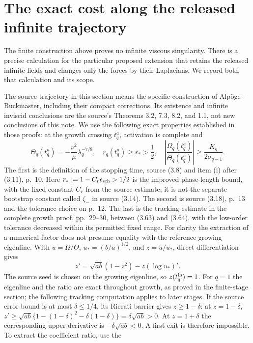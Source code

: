 \section{The exact cost along the released infinite trajectory}
\label{sec:infinitecost}
The finite construction above proves no infinite viscous singularity.
There is a precise calculation for the particular proposed extension
that retains the released infinite fields and changes only the forces
by their Laplacians. We record both that calculation and its scope.

The source trajectory in this section means the specific construction
of Alp\"oge--Buckmaster, including their compact corrections. Its
existence and infinite inviscid conclusions are the source's
Theorems 3.2, 7.3, 8.2, and 1.1, not new conclusions of this note.
We use the following exact properties established in those proofs:
at the growth crossing $t_q^a$, activation is complete and
\begin{equation}
 \Theta_q(t_q^a)=-\frac{\nu^2}{\mu}\lambda_q^{-7/8},
 \quad r_q(t_q^a)\geq r_*>\frac12,
 \quad \left|\frac{\Omega_q(t_q^a)}{\Theta_q(t_q^a)}\right|
 \geq\frac{K_q}{2\sigma_{q-1}}.
 \label{eq:sourcecrossingbounds}
\end{equation}
The first is the definition of the stopping time, source (3.8)
and item (i) after (3.11), p.~10. Here $r_*:=1-C_r\epsilon_{\rm sch}>1/2$ is the improved phase-length bound, with the fixed constant $C_r$ from the source estimate; it is not the separate bootstrap constant called $\zeta_-$ in source (3.14). The second is source (3.18),
p.~13 and the tolerance choice on p.~12. The last is the
tracking estimate in the complete growth proof, pp.~29--30,
between (3.63) and (3.64), with the low-order tolerance decreased
within its permitted fixed range. For clarity the extraction of
a numerical factor does not presume equality with the reference
growing eigenline. With $u=\Omega/\Theta$, $u_*=(b/a)^{1/2}$,
and $z=u/u_*$, direct differentiation gives
\[
 z'=\sqrt{ab}(1-z^2)-z(\log u_*)'.
\]
The source seed is chosen on the growing eigenline, so
$z(t_q^{\rm in})=1$. For $q=1$ the eigenline and the ratio
are exact throughout growth, as proved in the finite-stage
section; the following tracking computation applies to later
stages.
If the source error bound is at most $\delta\leq1/4$, its
Riccati barrier gives $z\geq1-\delta$: at $z=1-\delta$,
$z'\geq\sqrt{ab}\{1-(1-\delta)^2-\delta(1-\delta)\}
=\delta\sqrt{ab}>0$. At $z=1+\delta$ the corresponding
upper derivative is $-\delta\sqrt{ab}<0$. A first exit is
therefore impossible. To extract the coefficient ratio, use the
